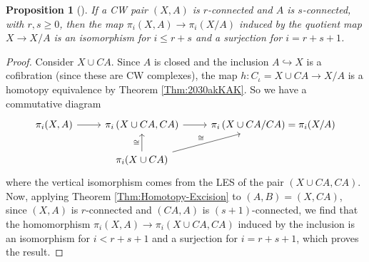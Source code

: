 \documentclass[reqno]{amsart}
\newtheorem{proposition}[theorem]{Proposition}
\theoremstyle{definition}
\theoremstyle{remark}
\begin{document}
\begin{proposition}[]\label{Prop:JXKDAOWJ}
    If a CW pair $\left( X,A \right) $ is $r$-connected
    and $A$ is $s$-connected, with $r,s \ge 0$, then
    the map $\pi_i (X,A) \to \pi_i (X /A)$ induced
    by the quotient map
    $X \to X / A$ is an isomorphism for
    $i \le r +s$ and a surjection for
    $i = r+s+1$.
\end{proposition}

\begin{proof}
    Consider $X \cup  CA$. Since
    $A$ is closed and the inclusion
    $A \hookrightarrow X$ is a cofibration (since these
    are CW complexes), the map
    $h \colon C_{\iota} = X \cup CA \to 
    X / A$ is a homotopy equivalence by Theorem 
    \ref{Thm:2030akKAK}. So we have a commutative
    diagram
    \begin{equation*}
    \begin{tikzcd}
        \pi_i (X,A) \ar[r] & \pi_i \left( X \cup CA, CA \right) 
        \ar[r] & \pi_i \left( X \cup  CA /CA \right) 
        = \pi_i (X / A)\\
               & \pi_i (X \cup  CA) \ar[u, "\cong"] 
               \ar[ru, "\cong"]
    \end{tikzcd}
    \end{equation*}
    where the vertical isomorphism comes from the
    LES of the pair $\left( X \cup CA, CA \right) $.
    Now, applying Theorem \ref{Thm:Homotopy-Excision}
    to $\left( A,B \right) = \left( X, CA \right) $,
    since $\left( X, A \right) $ is
    $r$-connected and
    $\left( CA, A \right) $ is
    $(s+1)$-connected, we find that the
    homomorphism 
    $\pi_i \left( X,A \right) \to 
    \pi_i \left( X \cup CA, CA \right) $ induced
    by the inclusion
    is an isomorphism for
    $i < r+s+1$ and a surjection for
    $i = r+s+1$, which proves the result.
\end{proof}
\end{document}
